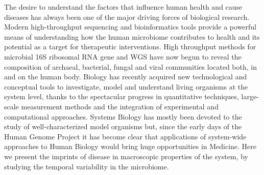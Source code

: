 The desire to understand the factors that influence human health and cause diseases has always been one of the major driving forces of biological research. Modern high-throughput sequencing and bioinformatics tools provide a powerful means of understanding how the human microbiome contributes to health and its potential as a target for therapeutic interventions. High throughput methods for microbial 16S ribosomal RNA gene and WGS have now begun to reveal the composition of archaeal, bacterial, fungal and viral communities located both, in and on the human body. Biology has recently acquired new technological and conceptual tools to investigate, model and understand living organisms at the system level, thanks to the spectacular progress in quantitative techniques, large-scale measurement methods and the integration of experimental and computational approaches. Systems Biology has mostly been devoted to the study of well-characterized model organisms but, since the early days of the Human Genome Project it has become clear that applications of system-wide approaches to Human Biology would bring huge opportunities in Medicine. Here we present the imprints of disease in macroscopic properties of the system, by studying the temporal variability in the microbiome.